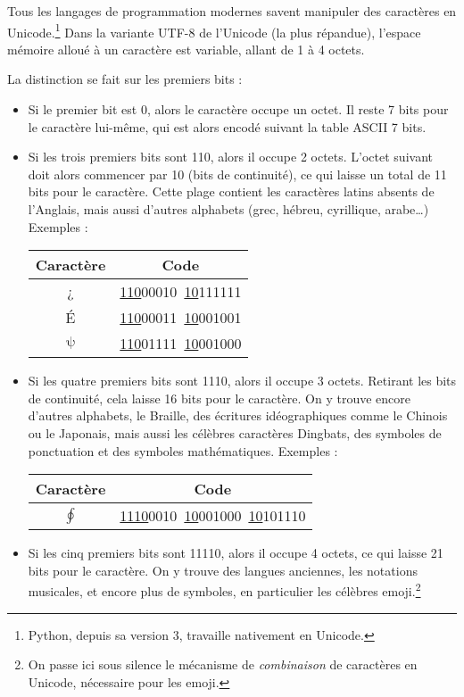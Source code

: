 Tous les langages de programmation modernes savent manipuler des caractères en Unicode.\footnote{Python, depuis sa version 3, travaille nativement en Unicode.} Dans la variante UTF-8 de l'Unicode (la plus répandue), l'espace mémoire alloué à un caractère est variable, allant de 1 à 4 octets.

La distinction se fait sur les premiers bits :
	\begin{itemize}
	\item Si le premier bit est 0, alors le caractère occupe un octet. Il reste 7 bits pour le caractère lui-même, qui est alors encodé suivant la table ASCII 7  bits.
	\item Si les trois premiers bits sont 110, alors il occupe 2 octets. L'octet suivant doit alors commencer par 10 (bits de continuité), ce qui laisse un total de 11 bits pour le caractère. Cette plage contient les caractères latins absents de l'Anglais, mais aussi d'autres alphabets (grec, hébreu, cyrillique, arabe\dots) Exemples :
		\begin{center}
		\begin{tabular}{cc}
		Caractère & Code\\
		\hline
		¿ & \underline{110}00010~\underline{10}111111\\
		É & \underline{110}00011~\underline{10}001001\\
		$\mathrm{\psi}$ & \underline{110}01111~\underline{10}001000
		\end{tabular}
		\end{center}
	\item Si les quatre premiers bits sont 1110, alors il occupe 3 octets. Retirant les bits de continuité, cela laisse 16 bits pour le caractère. On y trouve encore d'autres alphabets, le Braille, des écritures idéographiques comme le Chinois ou le Japonais, mais aussi les célèbres caractères Dingbats, des symboles de ponctuation et des symboles mathématiques. Exemples :
		\begin{center}
		\begin{tabular}{cc}
		Caractère & Code\\
		\hline
		$\oint$ & \underline{1110}0010~\underline{10}001000~\underline{10}101110
		\end{tabular}
		\end{center}
	\item Si les cinq premiers bits sont 11110, alors il occupe 4 octets, ce qui laisse 21 bits pour le caractère. On y trouve des langues anciennes, les notations musicales, et encore plus de symboles, en particulier les célèbres emoji.\footnote{On passe ici sous silence le mécanisme de \emph{combinaison} de caractères en Unicode, nécessaire pour les emoji.}
	\end{itemize}

